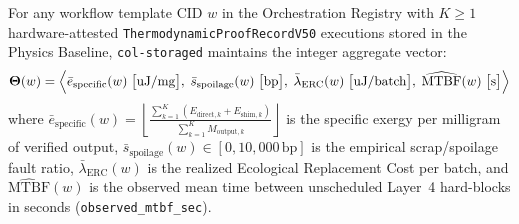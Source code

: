 \begin{definition}
\label{def:ch3-lineage-score}
For any workflow template CID $w$ in the Orchestration Registry with $K \ge 1$ hardware-attested \texttt{ThermodynamicProofRecordV50} executions stored in the Physics Baseline, \texttt{col-storaged} maintains the integer aggregate vector:
\begin{equation}
\mathbf{\Theta}(w) = \Bigl\langle \bar{e}_{\mathrm{specific}}(w)\;\bigl[\mathrm{uJ/mg}\bigr], \; \bar{s}_{\mathrm{spoilage}}(w)\;\bigl[\mathrm{bp}\bigr], \; \bar{\lambda}_{\mathrm{ERC}}(w)\;\bigl[\mathrm{uJ/batch}\bigr], \; \widehat{\mathrm{MTBF}}(w)\;\bigl[\mathrm{s}\bigr] \Bigr\rangle
\label{eq:ch3-physics-baseline-vector}
\end{equation}
where $\bar{e}_{\mathrm{specific}}(w) = \left\lfloor \frac{\sum_{k=1}^{K} (E_{\mathrm{direct},k} + E_{\mathrm{shim},k})}{\sum_{k=1}^{K} M_{\mathrm{output},k}} \right\rfloor$ is the specific exergy per milligram of verified output, $\bar{s}_{\mathrm{spoilage}}(w) \in [0, 10{,}000\,\mathrm{bp}]$ is the empirical scrap/spoilage fault ratio, $\bar{\lambda}_{\mathrm{ERC}}(w)$ is the realized Ecological Replacement Cost per batch, and $\widehat{\mathrm{MTBF}}(w)$ is the observed mean time between unscheduled Layer~4 hard-blocks in seconds (\texttt{observed\_mtbf\_sec}).
\end{definition}

